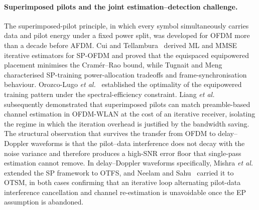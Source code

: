\paragraph{Superimposed pilots and the joint estimation--detection challenge.}
The superimposed-pilot principle, in which every symbol simultaneously
carries data and pilot energy under a fixed power split, was developed for
OFDM more than a decade before AFDM. Cui and
Tellambura~\cite{cui2007superimposed} derived ML and MMSE iterative
estimators for SP-OFDM and proved that the equispaced equipowered placement
minimises the Cram\'er--Rao bound, while Tugnait and
Meng~\cite{tugnait2006superimposed} characterised SP-training
power-allocation tradeoffs and frame-synchronisation behaviour. Orozco-Lugo
\emph{et al.}~\cite{orozco2011superimposed} established the optimality of
the equipowered training pattern under the spectral-efficiency constraint. Liang
\emph{et al.}~\cite{liang2011iterativesp} subsequently demonstrated that
superimposed pilots can match preamble-based channel estimation in OFDM-WLAN
at the cost of an iterative receiver, isolating the regime in which the
iteration overhead is justified by the bandwidth saving. The structural
observation that survives the transfer from OFDM to delay--Doppler waveforms
is that the pilot--data interference does not decay with the noise variance
and therefore produces a high-SNR error floor that single-pass estimation
cannot remove. In delay--Doppler waveforms specifically, Mishra \emph{et
al.}~\cite{mishra2022otfssp} extended the SP framework to OTFS, and Neelam
and Sahu~\cite{neelam2023otsmsp} carried it to OTSM, in both cases confirming
that an iterative loop alternating pilot-data interference cancellation and
channel re-estimation is unavoidable once the EP assumption is abandoned.

